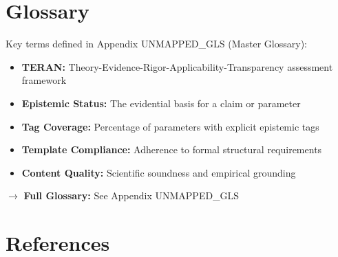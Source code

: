 \documentclass[11pt,a4paper]{article}
\begin{document}

\section*{Glossary}

Key terms defined in Appendix UNMAPPED_GLS (Master Glossary):
\begin{itemize}
    \item \textbf{TERAN:} Theory-Evidence-Rigor-Applicability-Transparency assessment framework
    \item \textbf{Epistemic Status:} The evidential basis for a claim or parameter
    \item \textbf{Tag Coverage:} Percentage of parameters with explicit epistemic tags
    \item \textbf{Template Compliance:} Adherence to formal structural requirements
    \item \textbf{Content Quality:} Scientific soundness and empirical grounding
\end{itemize}

$\rightarrow$ \textbf{Full Glossary:} See Appendix UNMAPPED_GLS


\section*{References}
\end{document}
